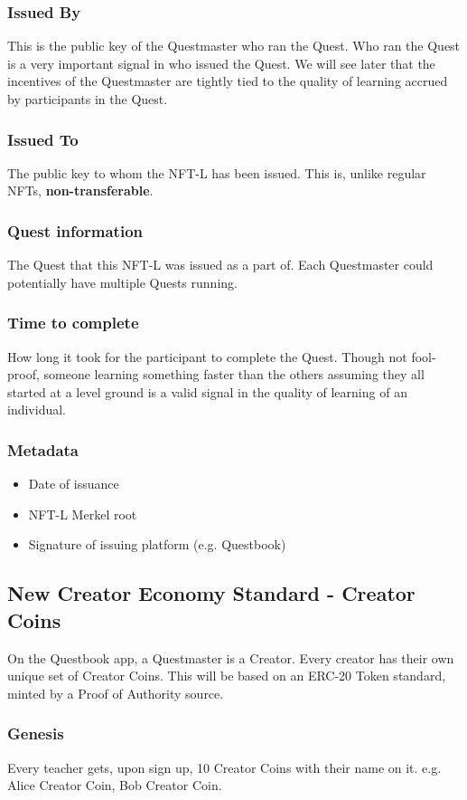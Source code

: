 \documentclass{article}
\begin{document}
      \subsubsection{Issued By}
        This is the public key of the Questmaster who ran the Quest. Who ran the Quest is a very important signal in who issued the Quest. We will see later that the incentives of the Questmaster are tightly tied to the quality of learning accrued by participants in the Quest. 
      \subsubsection{Issued To}
        The public key to whom the NFT-L has been issued. This is, unlike regular NFTs, \textbf{non-transferable}. 
      \subsubsection{Quest information}
        The Quest that this NFT-L was issued as a part of. Each Questmaster could potentially have multiple Quests running. 
      \subsubsection{Time to complete}
        How long it took for the participant to complete the Quest. Though not fool-proof, someone learning something faster than the others assuming they all started at a level ground is a valid signal in the quality of learning of an individual. 
      \subsubsection{Metadata}
        \begin{itemize}
          \item Date of issuance
          \item NFT-L Merkel root
          \item Signature of issuing platform (e.g. Questbook)
        \end{itemize}
    \subsection{New Creator Economy Standard - Creator Coins}
      On the Questbook app, a Questmaster is a Creator. Every creator has their own unique set of Creator Coins. This will be based on an ERC-20 Token standard, minted by a Proof of Authority source.
      \subsubsection{Genesis}
        Every teacher gets, upon sign up, 10 Creator Coins with their name on it. e.g. Alice Creator Coin, Bob Creator Coin.
\end{document}
